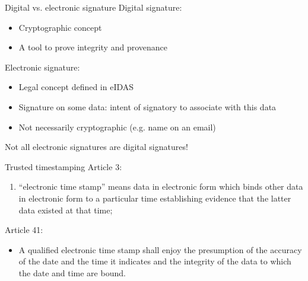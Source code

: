 \begin{frame}{Digital vs. electronic signature}
  Digital signature:
  \begin{itemize}[<+(1)->]
    \item Cryptographic concept
    \item A tool to prove integrity and provenance
  \end{itemize}

  \vspace*{1em}

  \pause
  Electronic signature:
  \begin{itemize}[<+(1)->]
    \item Legal concept defined in eIDAS
    \item Signature on some data: intent of signatory to associate with this data
    \item Not necessarily cryptographic (e.g. name on an email)
  \end{itemize}

  \vspace*{1em}

  \pause
  Not all electronic signatures are digital signatures!
\end{frame}

\begin{frame}{Trusted timestamping}
  \pause
  Article 3:
  \settowidth{\offset}{33}
  \addtolength{\leftmargini}{\offset}
  \begin{enumerate}
    \item[(33)] \enquote{electronic time stamp} means data in electronic form which binds other data in electronic form to a particular time establishing evidence that the latter data existed at that time;
  \end{enumerate}

  \pause
  Article 41:
  \begin{itemize}
    \setcounter{enumi}{1}
    \item A qualified electronic time stamp shall enjoy the presumption of the accuracy of the date and the time it indicates and the integrity of the data to which the date and time are bound.
  \end{itemize}
\end{frame}

